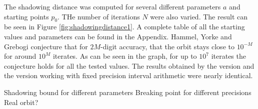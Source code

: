   The shadowing distance was computed for several different parameters $a$ and starting points $p_0$. THe number of iterations $N$ were also varied. 
  The result can be seen in Figure \ref{fig:shadowingdistance1}. A complete table of all the starting values and parameters can be found in the Appendix. Hammel, Yorke and Grebogi conjecture that for $2M$-digit accuracy, that the orbit stays close to $10^{-M}$ for around $10^M$ iterates. As can be seen in the graph, for up to $10^7$ iterates the conjecture holds for all the tested values.
  The results obtained by the \irram version and the version working with fixed precision interval arithmetic were nearly identical. 


  Shadowing bound for different parameters
  Breaking point for different precisions
  Real orbit?

